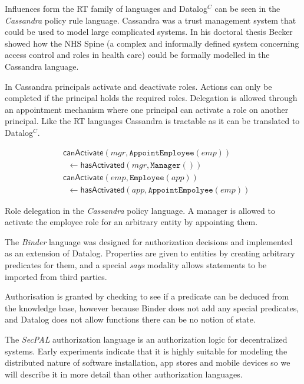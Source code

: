 \documentclass[a4paper,12pt,sfsidenotes]{tufte-book}
\begin{document}
Influences form the RT family of languages and Datalog$^C$ can be seen in the
\emph{Cassandra} policy rule language\cite{Becker:2004fi}. Cassandra was a
trust management system that could be used to model large complicated systems.
In his doctoral thesis Becker showed how the NHS Spine (a complex and informally
defined system concerning access control and roles in health care) could be
formally modelled in the Cassandra language.

In Cassandra principals activate and deactivate roles. Actions can only be completed if the
principal holds the required roles. Delegation is allowed through an
appointment mechanism where one principal can activate a role on another
principal. Like the RT languages Cassandra is tractable as it can be translated
to Datalog$^C$.

\begin{marginfigure}\label{code:cassandra}
  \begin{align*}
    &\textsf{canActivate}(mgr, \texttt{AppointEmployee}(emp)) \\
    &\;\;\gets \textsf{hasActivated}(mgr, \texttt{Manager}()) \\
    &\textsf{canActivate}(emp, \texttt{Employee}(app)) \\
    &\;\;\gets \textsf{hasActivated}(app, \texttt{AppointEmpolyee}(emp))
  \end{align*}
  \caption{Role delegation in the \emph{Cassandra} policy language. A manager is
  allowed to activate the employee role for an arbitrary entity by appointing
  them.}
\end{marginfigure}

The \emph{Binder} language\cite{DeTreville:2002ff} was designed for authorization
decisions\cite{Abadi:2003kt} and implemented as an extension of Datalog.
Properties are given to entities by creating arbitrary predicates for them, and
a special \emph{says} modality allows statements to be imported from third
parties.

Authorisation is granted by checking to see if a predicate can be deduced from
the knowledge base, however because Binder does not add any special predicates,
and Datalog does not allow functions there can be no notion of state.

The \emph{{SecPAL}} authorization language\cite{Becker:2006vh} is an authorization
logic for decentralized systems. Early experiments indicate that it is highly
suitable for modeling the distributed nature of software installation, app
stores and mobile devices so we will describe it in more detail than other
authorization languages.
\end{document}
